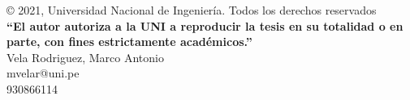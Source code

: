 \begin{permisos}

	\onehalfspacing  %
	
	© 2021, Universidad Nacional de Ingeniería. Todos los derechos reservados \\
	\textbf{``El autor autoriza a la UNI a reproducir la tesis en su totalidad o en parte, con fines estrictamente académicos.''} \\
	Vela Rodriguez, Marco Antonio \\
	mvelar@uni.pe \\
	930866114  
	
	\singlespacing  %
	
\end{permisos}
